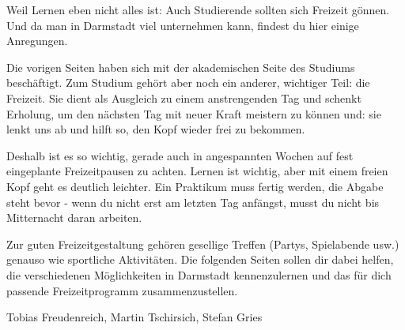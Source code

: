 {Weil Lernen eben nicht alles ist: Auch Studierende sollten sich Freizeit gönnen. Und da man in Darmstadt viel unternehmen kann, findest du hier einige Anregungen.
}{
Die vorigen Seiten haben sich mit der akademischen Seite des Studiums beschäftigt. Zum Studium gehört aber noch ein anderer, wichtiger Teil: die Freizeit. Sie dient als Ausgleich zu einem anstrengenden Tag und schenkt Erholung, um den nächsten Tag mit neuer Kraft meistern zu können und: sie lenkt uns ab und hilft so, den Kopf wieder frei zu bekommen.

Deshalb ist es so wichtig, gerade auch in angespannten Wochen auf fest eingeplante Freizeitpausen zu achten. Lernen ist wichtig, aber mit einem freien Kopf geht es deutlich leichter. Ein Praktikum muss fertig werden, die Abgabe steht bevor - wenn du nicht erst am letzten Tag anfängst, musst du nicht bis Mitternacht daran arbeiten.

Zur guten Freizeitgestaltung gehören gesellige Treffen (Partys, Spielabende usw.) genauso wie sportliche Aktivitäten. Die folgenden Seiten sollen dir dabei helfen, die verschiedenen Möglichkeiten in Darmstadt kennenzulernen und das für dich passende Freizeitprogramm zusammenzustellen.
}
{Tobias Freudenreich, Martin Tschirsich, Stefan Gries}
